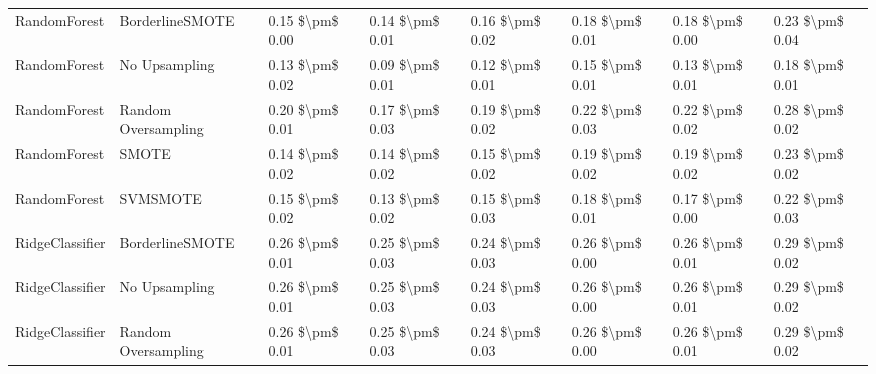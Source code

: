 \begin{tabular}{llllllll}
                   RandomForest &               BorderlineSMOTE &     0.15 \$\textbackslash pm\$ 0.00 &           0.14 \$\textbackslash pm\$ 0.01 &       0.16 \$\textbackslash pm\$ 0.02 &        0.18 \$\textbackslash pm\$ 0.01 &                         0.18 \$\textbackslash pm\$ 0.00 & 0.23 \$\textbackslash pm\$ 0.04 \\
                   RandomForest &                 No Upsampling &     0.13 \$\textbackslash pm\$ 0.02 &           0.09 \$\textbackslash pm\$ 0.01 &       0.12 \$\textbackslash pm\$ 0.01 &        0.15 \$\textbackslash pm\$ 0.01 &                         0.13 \$\textbackslash pm\$ 0.01 & 0.18 \$\textbackslash pm\$ 0.01 \\
                   RandomForest &           Random Oversampling &     0.20 \$\textbackslash pm\$ 0.01 &           0.17 \$\textbackslash pm\$ 0.03 &       0.19 \$\textbackslash pm\$ 0.02 &        0.22 \$\textbackslash pm\$ 0.03 &                         0.22 \$\textbackslash pm\$ 0.02 & 0.28 \$\textbackslash pm\$ 0.02 \\
                   RandomForest &                         SMOTE &     0.14 \$\textbackslash pm\$ 0.02 &           0.14 \$\textbackslash pm\$ 0.02 &       0.15 \$\textbackslash pm\$ 0.02 &        0.19 \$\textbackslash pm\$ 0.02 &                         0.19 \$\textbackslash pm\$ 0.02 & 0.23 \$\textbackslash pm\$ 0.02 \\
                   RandomForest &                      SVMSMOTE &     0.15 \$\textbackslash pm\$ 0.02 &           0.13 \$\textbackslash pm\$ 0.02 &       0.15 \$\textbackslash pm\$ 0.03 &        0.18 \$\textbackslash pm\$ 0.01 &                         0.17 \$\textbackslash pm\$ 0.00 & 0.22 \$\textbackslash pm\$ 0.03 \\
                RidgeClassifier &               BorderlineSMOTE &     0.26 \$\textbackslash pm\$ 0.01 &           0.25 \$\textbackslash pm\$ 0.03 &       0.24 \$\textbackslash pm\$ 0.03 &        0.26 \$\textbackslash pm\$ 0.00 &                         0.26 \$\textbackslash pm\$ 0.01 & 0.29 \$\textbackslash pm\$ 0.02 \\
                RidgeClassifier &                 No Upsampling &     0.26 \$\textbackslash pm\$ 0.01 &           0.25 \$\textbackslash pm\$ 0.03 &       0.24 \$\textbackslash pm\$ 0.03 &        0.26 \$\textbackslash pm\$ 0.00 &                         0.26 \$\textbackslash pm\$ 0.01 & 0.29 \$\textbackslash pm\$ 0.02 \\
                RidgeClassifier &           Random Oversampling &     0.26 \$\textbackslash pm\$ 0.01 &           0.25 \$\textbackslash pm\$ 0.03 &       0.24 \$\textbackslash pm\$ 0.03 &        0.26 \$\textbackslash pm\$ 0.00 &                         0.26 \$\textbackslash pm\$ 0.01 & 0.29 \$\textbackslash pm\$ 0.02 \\

\end{tabular}
